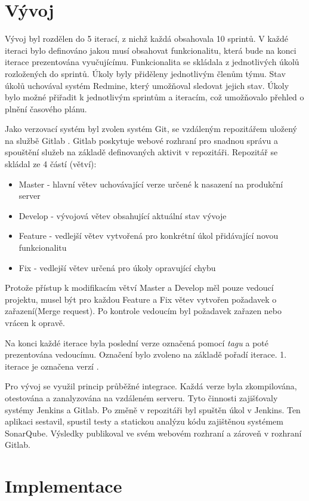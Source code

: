 \documentclass[thesis=B,czech]{FITthesis}[2012/06/26]
\begin{document}
\section{Vývoj}
Vývoj byl rozdělen do 5 iterací, z nichž každá obsahovala 10 sprintů. 
V každé iteraci bylo definováno jakou musí obsahovat funkcionalitu, která bude na konci iterace prezentována vyučujícímu. Funkcionalita se skládala z jednotlivých úkolů rozložených do sprintů.
Úkoly byly přiděleny jednotlivým členům týmu. Stav úkolů uchovával systém Redmine\cite{Redmine}, který umožňoval sledovat jejich stav.
Úkoly bylo možné přiřadit k jednotlivým sprintům a iteracím, což umožňovalo přehled o plnění časového plánu.
\par
Jako verzovací systém byl zvolen systém Git, se vzdáleným repozitářem uložený na službě Gitlab \cite{gitlab}. Gitlab poskytuje webové rozhraní pro snadnou správu a spouštění služeb na základě definovaných aktivit v repozitáři. Repozitář se skládal ze 4 částí (větví):
\begin{itemize}
\item Master - hlavní větev uchovávající verze určené k nasazení na produkční server
\item Develop - vývojová větev obsahující aktuální stav vývoje
\item Feature - vedlejší větev vytvořená pro konkrétní úkol přidávající novou funkcionalitu
\item Fix - vedlejší větev určená pro úkoly opravující chybu
\end{itemize}
Protože přístup k modifikacím větví Master a Develop měl pouze vedoucí projektu, musel být pro každou Feature a Fix větev
vytvořen požadavek o zařazení(Merge request). Po kontrole vedoucím byl požadavek zařazen nebo vrácen k opravě.
\par
Na konci každé iterace byla poslední verze označená pomocí \textit{tagu} a poté prezentována vedoucímu.
Označení bylo zvoleno na základě pořadí iterace. 1. iterace je označena verzí .
\par
Pro vývoj se využil princip průběžné integrace. Každá verze byla zkompilována, otestována a zanalyzována na vzdáleném serveru.
Tyto činnosti zajišťovaly systémy Jenkins\cite{jenkins} a Gitlab. Po změně v repozitáři byl spuštěn úkol v Jenkins. Ten aplikaci sestavil, spustil testy a statickou analýzu kódu 
zajištěnou systémem SonarQube\cite{sonar}. Výsledky publikoval ve svém webovém rozhraní a zároveň v rozhraní Gitlab.  
\section{Implementace}
\end{document}
